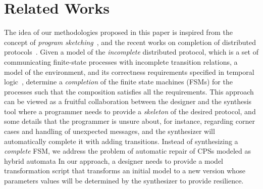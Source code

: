 \section{Related Works}
%
The idea of our methodologies proposed in this paper is inspired from the concept of \emph{program sketching}~\cite{solar2013program,solar2005programming}, and the recent works on completion of distributed protocols~\cite{alur2017automatic, alur2015automatic, alur2014synthesizing}. Given a model of the \emph{incomplete} distributed protocol, which is a set of communicating finite-state processes with incomplete transition relations, a model of the environment, and its correctness requirements specified in temporal logic~\cite{clarke2000model}, determine a \emph{completion} of the finite state machines (FSMs) for the processes such that the composition satisfies all the requirements. This approach can be viewed as a fruitful collaboration between the designer and the synthesis tool where a programmer needs to provide a \emph{skeleton} of the desired protocol, and some details that the programmer is unsure about, for instance, regarding corner cases and handling of unexpected messages, and the synthesizer will automatically complete it with adding transitions.
%
%
Instead of synthesizing a \emph{complete} FSM, we address the problem of automatic repair of CPSs modeled as hybrid automata%
%
%
%
In our approach, a designer needs to provide a model transformation script that transforms an initial model to a new version whose parameters values will be determined by the synthesizer to provide resilience. 
%

